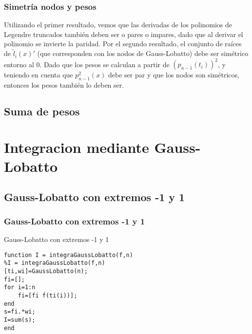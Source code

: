\documentclass{beamer}
\begin{document}

\begin{frame}
\frametitle{Simetría nodos y pesos}
Utilizando el primer resultado, vemos que las derivadas de los polinomios de Legendre truncados también deben ser o pares o impares, dado que al derivar el polinomio se invierte la paridad. Por el segundo resultado, el conjunto de raíces de $\tilde l_i(x)'$ (que corresponden con los nodos de Gauss-Lobatto) debe ser simétrico entorno al 0. Dado que los pesos se calculan a partir de $(p_{n-1}(t_i))^2$, y teniendo en cuenta que $p_{n-1}^2(x)$ debe ser par y que los nodos son simétricos, entonces los pesos también lo deben ser. 
\end{frame}
\subsection{Suma de pesos}
\begin{frame}

\end{frame}
\section{Integracion mediante Gauss-Lobatto}
\subsection{Gauss-Lobatto con extremos -1 y 1}
\begin{frame}[fragile] %
\frametitle{Gauss-Lobatto con extremos -1 y 1}
\begin{exampleblock}{Gauss-Lobatto con extremos -1 y 1}
\begin{verbatim}
function I = integraGaussLobatto(f,n)
%I = integraGaussLobatto(f,n)
[ti,wi]=GaussLobatto(n);
fi=[];
for i=1:n
    fi=[fi f(ti(i))];
end
s=fi.*wi;
I=sum(s);
end
\end{verbatim}
\end{exampleblock}
\end{frame}


\end{document}
